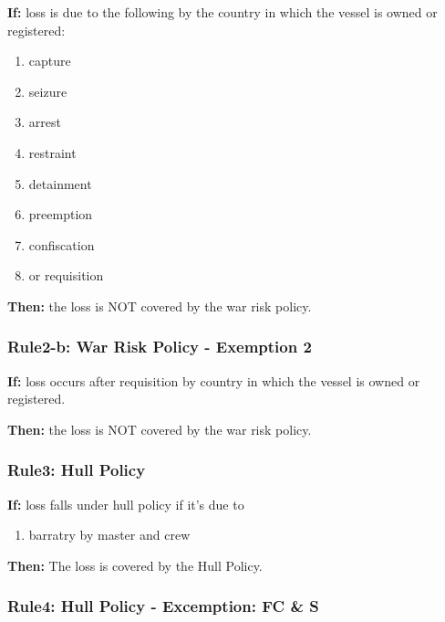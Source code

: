     \textbf{If:} loss is due to the following by the country in which the vessel is owned or registered: 
    \begin{enumerate}
        \item capture
        \item seizure
        \item arrest
        \item restraint 
        \item detainment
        \item preemption
        \item confiscation
        \item or requisition
    \end{enumerate}
    
    \textbf{Then:} the loss is NOT covered by the war risk policy.
    
    

\subsubsection{Rule2-b: War Risk Policy - Exemption 2}

    \textbf{If:} loss occurs after requisition by country in which the vessel is owned or registered.
    
    \textbf{Then:} the loss is NOT covered by the war risk policy.
    
\subsubsection{Rule3: Hull Policy}

    
    \textbf{If:} loss falls under hull policy if it's due to
    \begin{enumerate}
        \item barratry by master and crew
    \end{enumerate}
    
    \textbf{Then:} The loss is covered by the Hull Policy.

\subsubsection{ Rule4: Hull Policy - Excemption: FC \& S}

